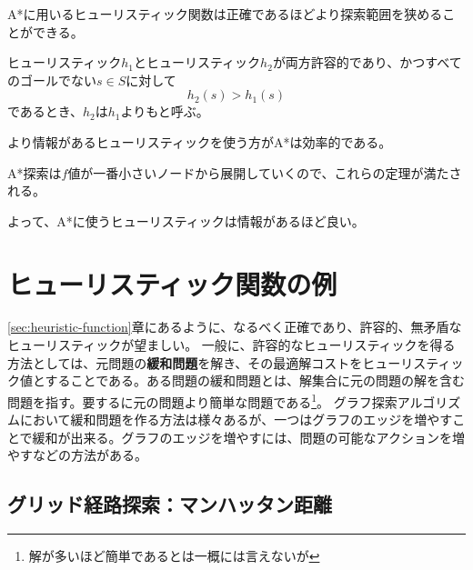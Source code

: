 A*に用いるヒューリスティック関数は正確であるほどより探索範囲を狭めることができる。

 {
  ヒューリスティック$h_1$とヒューリスティック$h_2$が両方許容的であり、かつすべてのゴールでない$s \in S$に対して
  \begin{equation}
    h_2(s) > h_1(s)
  \end{equation}
  であるとき、$h_2$は$h_1$よりもと呼ぶ。
}

より情報があるヒューリスティックを使う方がA*は効率的である。



A*探索は$f$値が一番小さいノードから展開していくので、これらの定理が満たされる。


よって、A*に使うヒューリスティックは情報があるほど良い。


\section{ヒューリスティック関数の例}
\label{sec:heuristic-example}

\ref{sec:heuristic-function}章にあるように、なるべく正確であり、許容的、無矛盾なヒューリスティックが望ましい。
一般に、許容的なヒューリスティックを得る方法としては、元問題の{\bf 緩和問題}を解き、その最適解コストをヒューリスティック値とすることである。ある問題の緩和問題とは、解集合に元の問題の解を含む問題を指す。要するに元の問題より簡単な問題である\footnote{解が多いほど簡単であるとは一概には言えないが}。
グラフ探索アルゴリズムにおいて緩和問題を作る方法は様々あるが、一つはグラフのエッジを増やすことで緩和が出来る。グラフのエッジを増やすには、問題の可能なアクションを増やすなどの方法がある。

\subsection{グリッド経路探索：マンハッタン距離}

